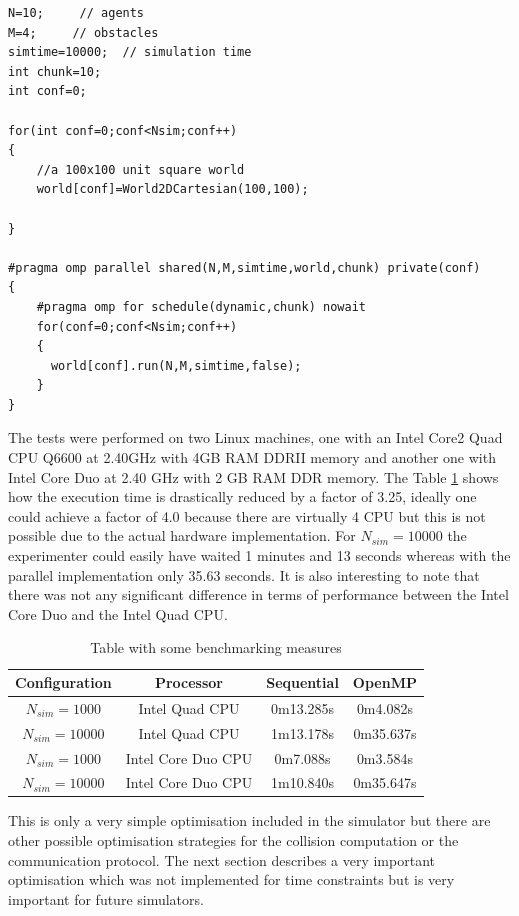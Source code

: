 \begin{lstlisting}
N=10;     // agents
M=4;     // obstacles
simtime=10000;  // simulation time
int chunk=10;
int conf=0;

for(int conf=0;conf<Nsim;conf++)
{
    //a 100x100 unit square world
    world[conf]=World2DCartesian(100,100);

}

#pragma omp parallel shared(N,M,simtime,world,chunk) private(conf)
{
    #pragma omp for schedule(dynamic,chunk) nowait
    for(conf=0;conf<Nsim;conf++)
    {
      world[conf].run(N,M,simtime,false);
    }
}
\end{lstlisting}
The tests were performed on two Linux machines, one with an Intel Core2 Quad CPU Q6600
at 2.40GHz with 4GB RAM DDRII memory and another one with Intel Core Duo  at 2.40 GHz with 2 GB RAM DDR memory.
The Table \ref{tab:Parallel:benchmark} shows how the execution time is drastically
reduced by a factor of 3.25, ideally one could achieve a factor of 4.0 because
there are virtually 4 CPU but this is not possible due to the actual hardware
implementation.
For $N_{sim}=10000$ the experimenter could easily have waited 1 minutes and 13 seconds
whereas with the parallel implementation only 35.63 seconds.
It is also interesting to note that there was not any significant difference in terms of performance
between the Intel Core Duo and the Intel Quad CPU.
\begin{table}[htbp]
\caption[Parallel Simulator performance]{
Table with some benchmarking measures}
\label{tab:Parallel:benchmark}
\begin{center}
\small{
\begin{tabular}{@{}c|ccc@{}}
\hline
Configuration & Processor & Sequential& OpenMP \\
\hline
$N_{sim}=1000$   & Intel Quad CPU     &  0m13.285s & 0m4.082s  \\
$N_{sim}=10000$  & Intel Quad CPU     &  1m13.178s & 0m35.637s \\
$N_{sim}=1000$   & Intel Core Duo CPU &  0m7.088s & 0m3.584s   \\
$N_{sim}=10000$  & Intel Core Duo CPU &  1m10.840s & 0m35.647s \\
\hline
\end{tabular}
}
\end{center}
\end{table}

This is only a very simple optimisation included in the simulator but there are
other possible optimisation strategies for the collision computation or
the communication protocol.
The next section describes a very important optimisation which was not implemented
for time constraints but is very important for future simulators.
